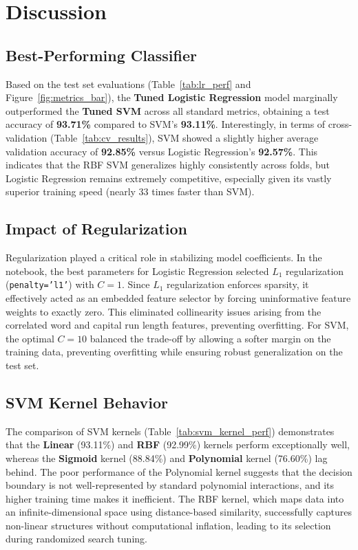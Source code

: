 \documentclass[12pt,a4paper]{article}
\begin{document}
\section{Discussion}

\subsection{Best-Performing Classifier}
Based on the test set evaluations (Table~\ref{tab:lr_perf} and Figure~\ref{fig:metrics_bar}), the \textbf{Tuned Logistic Regression} model marginally outperformed the \textbf{Tuned SVM} across all standard metrics, obtaining a test accuracy of \textbf{93.71\%} compared to SVM's \textbf{93.11\%}. Interestingly, in terms of cross-validation (Table~\ref{tab:cv_results}), SVM showed a slightly higher average validation accuracy of \textbf{92.85\%} versus Logistic Regression's \textbf{92.57\%}. This indicates that the RBF SVM generalizes highly consistently across folds, but Logistic Regression remains extremely competitive, especially given its vastly superior training speed (nearly 33 times faster than SVM).

\subsection{Impact of Regularization}
Regularization played a critical role in stabilizing model coefficients. In the notebook, the best parameters for Logistic Regression selected $L_1$ regularization (\texttt{penalty='l1'}) with $C=1$. Since $L_1$ regularization enforces sparsity, it effectively acted as an embedded feature selector by forcing uninformative feature weights to exactly zero. This eliminated collinearity issues arising from the correlated word and capital run length features, preventing overfitting. For SVM, the optimal $C=10$ balanced the trade-off by allowing a softer margin on the training data, preventing overfitting while ensuring robust generalization on the test set.

\subsection{SVM Kernel Behavior}
The comparison of SVM kernels (Table~\ref{tab:svm_kernel_perf}) demonstrates that the \textbf{Linear} (93.11\%) and \textbf{RBF} (92.99\%) kernels perform exceptionally well, whereas the \textbf{Sigmoid} kernel (88.84\%) and \textbf{Polynomial} kernel (76.60\%) lag behind. The poor performance of the Polynomial kernel suggests that the decision boundary is not well-represented by standard polynomial interactions, and its higher training time makes it inefficient. The RBF kernel, which maps data into an infinite-dimensional space using distance-based similarity, successfully captures non-linear structures without computational inflation, leading to its selection during randomized search tuning.
\end{document}
